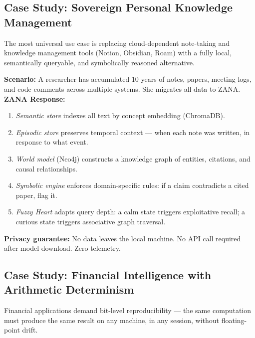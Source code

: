 \documentclass[12pt,a4paper]{article}
\begin{document}
\subsection{Case Study: Sovereign Personal Knowledge Management}

The most universal use case is replacing cloud-dependent note-taking and knowledge management
tools (Notion, Obsidian, Roam) with a fully local, semantically queryable, and symbolically
reasoned alternative.

\begin{tcolorbox}[defbox, title={Use Case: Personal Knowledge Sovereignty}]
\textbf{Scenario:} A researcher has accumulated 10 years of notes, papers, meeting logs, and
code comments across multiple systems. She migrates all data to ZANA.\\[4pt]
\textbf{ZANA Response:}
\begin{enumerate}[leftmargin=*, itemsep=0pt]
  \item \textit{Semantic store} indexes all text by concept embedding (ChromaDB).
  \item \textit{Episodic store} preserves temporal context --- when each note was written,
    in response to what event.
  \item \textit{World model} (Neo4j) constructs a knowledge graph of entities, citations,
    and causal relationships.
  \item \textit{Symbolic engine} enforces domain-specific rules: if a claim contradicts a
    cited paper, flag it.
  \item \textit{Fuzzy Heart} adapts query depth: a calm state triggers exploitative recall;
    a curious state triggers associative graph traversal.
\end{enumerate}
\textbf{Privacy guarantee:} No data leaves the local machine. No API call required after
model download. Zero telemetry.
\end{tcolorbox}

\subsection{Case Study: Financial Intelligence with Arithmetic Determinism}

Financial applications demand bit-level reproducibility --- the same computation must produce
the same result on any machine, in any session, without floating-point drift.
\end{document}
